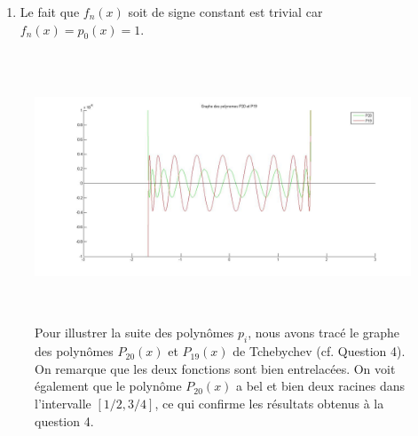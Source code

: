 \begin{enumerate}
\begin{proof}
      Comme les racines sont entrelacées, dans l'intervalle $]-\infty; \xi[$,
      il y a le même nombre de racines de $f_0$ que de racines de $f_1$.
      Ils ont donc changé de signe le même nombre de fois.
      Ils sont dès lors toujours de signe différent comme en $-\infty$.

    On sait que $p_0'(\xi)p_0(\xi - \epsilon) < 0$.
    En effet, soit $q(x)$ tel que $q(\xi) \neq 0$ et
    $p_0(x) = (x - \xi) q(x)$.
    Soit $\epsilon > 0$ tel que
    $p_1(x), q(x) \neq 0$ $\forall x \in [\xi - \epsilon, \xi]$.
    On a $p_0'(x) = q(x) + (x - \xi) q'(x)$ d'où
    $p_0(\xi - \epsilon) = -\epsilon q(\xi - \epsilon)$ et
    $p_0'(\xi) = q(\xi)$.
    Comme $q$ est un polynôme, il est continu donc comme il n'y a pas
    de racine entre $\xi - \epsilon$ et $\xi$, $q(\xi - \epsilon)$ et $q(\xi)$
    sont de même signe.
    Du même raisonnement, $p_1(\xi - \epsilon)$ et $p_1(\xi)$ sont
    de même signe.
    Comme $\epsilon > 0$, on sait alors que que
    $p_0'(\xi)$ et $p_0(\xi - \epsilon)$ sont de signe opposé.
    comme on savait que $p_0(\xi - \epsilon)$ et $p_1(\xi - \epsilon)$ sont
    de signe opposé, on a bien $p_0'(\xi) p_1(\xi) > 0$.
    \end{proof}
  \item Le fait que $f_n(x)$ soit de signe constant est trivial car
    $f_n(x) = p_0(x) = 1$.
\end{enumerate}

\begin{center}
\begin{figure}
\includegraphics[height=8cm]{fig3.jpg}
\caption{Pour illustrer la suite des polynômes $p_i$, nous avons tracé le graphe des polynômes $P_{20}(x)$ et $P_{19}(x)$ de Tchebychev (cf. Question 4). On remarque que les deux fonctions sont bien entrelacées. On voit également que le polynôme $P_{20}(x)$ a bel et bien deux racines dans l'intervalle $[1/2, 3/4]$, ce qui confirme les résultats obtenus à la question 4.}
\label{figure_Tcheb}
\end{figure}
\end{center}
